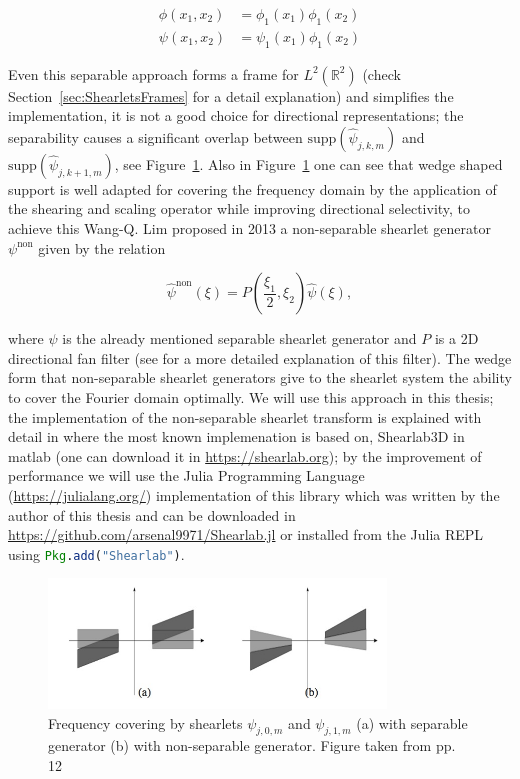 $$
\begin{aligned}
\phi(x_1,x_2)&=\phi_1(x_1)\phi_1(x_2)\\
\psi(x_1,x_2)&=\psi_1(x_1)\phi_1(x_2)
\end{aligned}
$$

Even this separable approach forms a frame for $L^2(\mathbb{R}^2)$ (check Section~\ref{sec:ShearletsFrames} for a detail explanation) and simplifies the implementation, it is not a good choice for directional representations; the separability causes a significant overlap between $\text{supp}(\hat{\psi}_{j,k,m})$ and $\text{supp}(\hat{\psi}_{j,k+1,m})$, see Figure~\ref{fig:separable_nonseparable}. Also in Figure~\ref{fig:separable_nonseparable} one can see that wedge shaped support is well adapted for covering the frequency domain by the application of the shearing and scaling operator while improving directional selectivity, to achieve this Wang-Q. Lim proposed in 2013 a non-separable shearlet generator $\psi^{\text{non}}$ given by the relation

$$
\hat{\psi}^{\text{non}}(\xi)=P\left(\frac{\xi_1}{2},\xi_2\right)\hat{\psi}(\xi),
$$

where $\psi$ is the already mentioned separable shearlet generator and $P$ is a 2D directional fan filter (see \cite{Nonseparableshear} for a more detailed explanation of this filter). The wedge form that non-separable shearlet generators give to the shearlet system the ability to cover the Fourier domain optimally. We will use this approach in this thesis; the implementation of the non-separable shearlet transform is explained with detail in \cite{Shearlab} where the most known implemenation is based on, Shearlab3D in matlab (one can download it in \url{https://shearlab.org}); by the improvement of performance we will use the Julia Programming Language (\url{https://julialang.org/}) implementation of this library which was written by the author of this thesis and can be downloaded in \url{https://github.com/arsenal9971/Shearlab.jl} or installed from the Julia REPL using \lstinline[language=julia]{Pkg.add("Shearlab")}.

\begin{figure}[h!]
\centering
\includegraphics[width=0.8\textwidth]{./Diagrams/separable_nonseparable.jpg}
\caption{Frequency covering by shearlets $\psi_{j,0,m}$ and $\psi_{j,1,m}$ (a) with separable generator (b) with non-separable generator. Figure taken from \cite{Nonseparableshear} pp. 12}
\label{fig:separable_nonseparable}
\end{figure}

